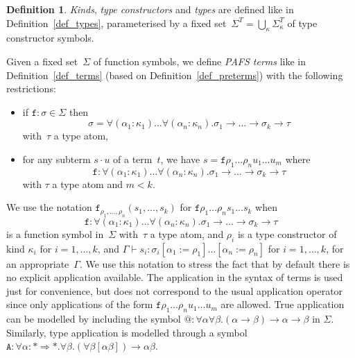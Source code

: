 \documentclass[a4paper,UKenglish,cleveref,autoref,numberwithinsect]{lipics-v2019}
\theoremstyle{definition}
\newtheorem{defn}[theorem]{Definition}
\newcommand{\arrkind}{\Rightarrow}
\newcommand{\arrtype}{\rightarrow}
\newcommand{\app}[2]{#1 \cdot #2}
\newcommand{\proves}{\vdash}
\begin{document}
\begin{defn}\label{def_pafs_types_terms}
  \emph{Kinds}, \emph{type constructors} and \emph{types} are defined
  like in Definition~\ref{def_types}, parameterised by a fixed
  set~$\Sigma^T = \bigcup_{\kappa}\Sigma^T_\kappa$ of type constructor
  symbols.

  Given a fixed set~$\Sigma$ of function symbols, we define \emph{PAFS
    terms} like in Definition~\ref{def_terms} (based on
  Definition~\ref{def_preterms}) with the following restrictions:
  \begin{itemize}
  \item if $\mathtt{f} : \sigma \in \Sigma$ then
    \[
    \sigma = \forall (\alpha_1 : \kappa_1) \ldots \forall (\alpha_n : \kappa_n)
    . \sigma_1 \arrtype \ldots \arrtype \sigma_k \arrtype \tau
    \]
    with~$\tau$ a type atom,
  \item for any subterm $\app{s}{u}$ of a term~$t$, we have $s =
    \mathtt{f} \rho_1 \ldots \rho_n u_1 \ldots u_m$ where
    \[
    \mathtt{f} : \forall (\alpha_1 : \kappa_1) \ldots
    \forall (\alpha_n : \kappa_n) . \sigma_1 \arrtype \ldots \arrtype
    \sigma_k \arrtype \tau
    \]
    with $\tau$ a type atom and $m < k$.
  \end{itemize}
\end{defn}

We use the notation
$\mathtt{f}_{\rho_1,\ldots,\rho_n}(s_1,\ldots,s_k)$ for
$\mathtt{f} \rho_1 \ldots \rho_n s_1 \ldots s_k$ when
\[
  \mathtt{f} : \forall (\alpha_1 : \kappa_1) \ldots
  \forall (\alpha_n : \kappa_n) . \sigma_1 \arrtype \ldots \arrtype
  \sigma_k \arrtype \tau
\]
is a function symbol in~$\Sigma$ with~$\tau$ a type atom, and $\rho_i$
is a type constructor of kind $\kappa_i$ for $i=1,\ldots,k$, and
$\Gamma \proves s_i : \sigma_i[\alpha_1 := \rho_1]\ldots[\alpha_n :=
  \rho_n]$ for $i=1,\ldots,k$, for an appropriate~$\Gamma$. We use
this notation to stress the fact that by default there is no explicit
application available. The application in the syntax of terms is used
just for convenience, but does not correspond to the usual application
operator since only applications of the form $\mathtt{f} \rho_1 \ldots
\rho_n u_1 \ldots u_m$ are allowed. True application can be modelled
by including the symbol ${@} : \forall\alpha\forall\beta . (\alpha
\arrtype \beta) \arrtype \alpha \arrtype \beta$ in
$\Sigma$. Similarly, type application is modelled through a symbol
$\mathtt{A} : \forall \alpha : * \arrkind * . \forall \beta . (\forall
\beta [\alpha \beta]) \arrtype \alpha \beta$.
\end{document}
